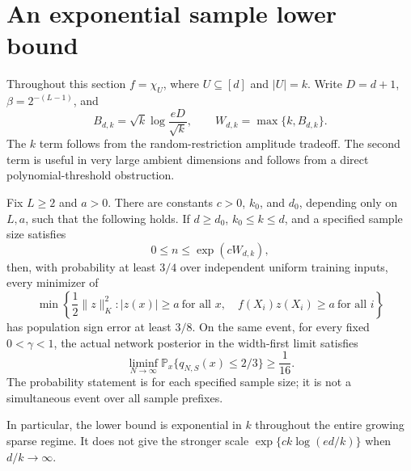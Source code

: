 \section{An exponential sample lower bound}
\label{sec:positive-sparse-partial}
Throughout this section $f=\chi_U$, where $U\subseteq[d]$ and $|U|=k$.
Write $D=d+1$, $\beta=2^{-(L-1)}$, and
\[
 B_{d,k}=\sqrt{k}\log\frac{eD}{\sqrt{k}},\qquad
 W_{d,k}=\max\{k,B_{d,k}\}.
\]
The $k$ term follows from the random-restriction amplitude tradeoff.
The second term is useful in very large ambient dimensions and follows
from a direct polynomial-threshold obstruction.

\begin{theorem}
\label{thm:positive-sparse-partial}
Fix $L\ge2$ and $a>0$. There are constants $c>0$, $k_0$, and $d_0$,
depending only on $L,a$, such that the following holds. If
$d\ge d_0$, $k_0\le k\le d$, and a specified sample size satisfies
\[
 0\le n\le\exp(cW_{d,k}),
\]
then, with probability at least $3/4$ over independent uniform training
inputs, every minimizer of
\[
 \min\left\{\frac12\|z\|_K^2:
 |z(x)|\ge a\ \text{for all }x,\quad
 f(X_i)z(X_i)\ge a\ \text{for all }i\right\}
\]
has population sign error at least $3/8$.
On the same event, for every fixed $0<\gamma<1$, the actual network
posterior in the width-first limit satisfies
\[
 \liminf_{N\to\infty}
 \mathbb P_x\{q_{N,S}(x)\le2/3\}\ge\frac1{16}.
\]
The probability statement is for each specified sample size; it is not
a simultaneous event over all sample prefixes.
\end{theorem}

In particular, the lower bound is exponential in $k$ throughout the
entire growing sparse regime. It does not give the stronger scale
$\exp\{c k\log(ed/k)\}$ when $d/k\to\infty$.

